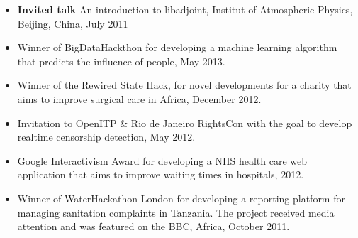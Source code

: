 \documentclass[11pt]{article}
\newenvironment{outerlist}[1][\enskip\textbullet]
        {\begin{itemize}[ #1]}{\end{itemize}}
\begin{document}
\begin{outerlist}
\item[] \textbf{Invited talk} An introduction to libadjoint, Institut of Atmospheric Physics, Beijing, China, July 2011
\end{outerlist}

\begin{outerlist}
\item[] Winner of BigDataHackthon for developing a machine learning algorithm that predicts the influence of people, May 2013.
\item[] Winner of the Rewired State Hack, for novel developments for a charity that aims to improve surgical care in Africa, December 2012.
\item[] Invitation to OpenITP \& Rio de Janeiro RightsCon with the goal to develop realtime censorship detection, May 2012.
\item[] Google Interactivism Award for developing a NHS health care web application that aims to improve waiting times in hospitals, 2012.
\item[] Winner of WaterHackathon London for developing a reporting platform for managing sanitation complaints in Tanzania. The project received media attention and was featured on the BBC, Africa, October 2011.
\end{outerlist}
\end{document}
